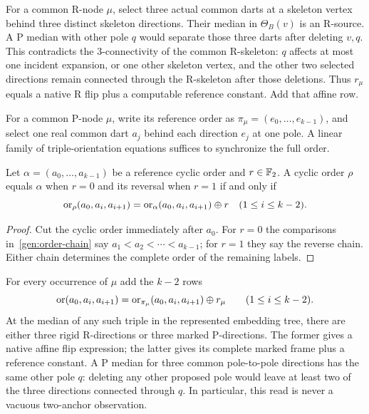 For a common R-node $\mu$, select three actual common darts at a skeleton
vertex behind three distinct skeleton directions.  Their median in
$\Theta_B(v)$ is an R-source.  A P median with other pole $q$ would
separate those three darts after deleting $v,q$.  This contradicts the
3-connectivity of the common R-skeleton: $q$ affects at most one incident
expansion, or one other skeleton vertex, and the other two selected
directions remain connected through the R-skeleton after those deletions.
Thus $r_\mu$ equals a native R flip plus a computable reference constant.
Add that affine row.

For a common P-node $\mu$, write its reference order as
$\pi_\mu=(e_0,\ldots,e_{k-1})$, and select one real common dart
$a_j$ behind each direction $e_j$ at one pole.  A linear family of
triple-orientation equations suffices to synchronize the full order.

\begin{lemma}
\label{gen:chain-lemma}
Let $\alpha=(a_0,\ldots,a_{k-1})$ be a reference cyclic order and
$r\in\mathbb F_2$.  A cyclic order $\rho$ equals $\alpha$ when $r=0$ and
its reversal when $r=1$ if and only if
\begin{equation}\label{gen:order-chain}
 \operatorname{or}_\rho(a_0,a_i,a_{i+1})
  =\operatorname{or}_\alpha(a_0,a_i,a_{i+1})\oplus r
 \quad (1\le i\le k-2).
\end{equation}
\end{lemma}
\begin{proof}
Cut the cyclic order immediately after $a_0$.  For $r=0$ the
comparisons in~\eqref{gen:order-chain} say
$a_1<a_2<\cdots<a_{k-1}$; for $r=1$ they say the reverse chain.
Either chain determines the complete order of the remaining labels.
\end{proof}

For every occurrence of $\mu$ add the $k-2$ rows
\begin{equation}\label{gen:chain-rows}
 \operatorname{or}(a_0,a_i,a_{i+1})
   =\operatorname{or}_{\pi_\mu}(a_0,a_i,a_{i+1})\oplus r_\mu
 \qquad (1\le i\le k-2).
\end{equation}
At the median of any such triple in the represented embedding tree,
there are either three rigid R-directions or three marked P-directions.
The former gives a native affine flip expression; the latter gives its
complete marked frame plus a reference constant.  A P median for three
common pole-to-pole directions has the same other pole $q$: deleting
any other proposed pole would leave at least two of the three directions
connected through $q$.  In particular, this read is never a vacuous
two-anchor observation.

